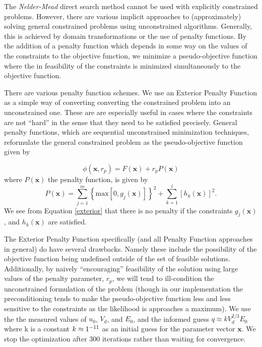 \documentclass[10pt,a4paper]{article}
\begin{document}
The \emph{Nelder-Mead} direct search method cannot be used with explicitly constrained problems. However, there are various implicit approaches to (approximately) solving general constrained problems using unconstrained algorithms. Generally, this is achieved by domain transformations or the use of penalty functions.  By the addition of a penalty function which depends in some way on the values of the constraints to the objective function, we minimize a pseudo-objective function where the in feasibility of the constraints is minimized simultaneously to the objective function. 

There are various penalty function schemes. We use an Exterior Penalty Function as a simple way of converting converting the constrained problem into an unconstrained one. These are are especially useful in cases where the constraints are not ``hard'' in the sense that they need to be satisfied precisely. General penalty functions, which are sequential unconstrained minimization techniques, reformulate the general constrained problem as the pseudo-objective function given by

\[ \phi(\mathbf{x}, r_p ) = F(\mathbf{x}) + r_p P(\mathbf{x}) \]
where $P \left( \mathbf{x} \right)$ the penalty function, is given by
\begin{equation} \label{exterior}
 P( \mathbf{x} ) = \sum_{j = 1}^m \left\lbrace \mbox{max} \left[ 0, g_j(\mathbf{x} ) \right] \right\rbrace^2 + 
\sum_{k = 1}^l \left[ h_k( \mathbf{x}) \right]^2 .
\end{equation}
We see from Equation \ref{exterior} that there is no penalty if the constraints $g_j(\mathbf{x})$, and $h_k(\mathbf{x})$ are satisfied.
 
The Exterior Penalty Function specifically (and all Penalty Function approaches in general) do have several drawbacks. Namely these include the possibility of the objective function being undefined outside of the set of feasible solutions. Additionally, by naively ``encouraging'' feasibility of the solution using large values of the penalty parameter, $r_p$, we will tend to ill-condition the unconstrained formulation of the problem (though in our implementation the preconditioning tends to make the pseudo-objective function less and less sensitive to the constraints as the likelihood is approaches a maximum). We use the the measured values of $u_0$, $V_d$, and $E_0$, and the informed guess $q \approx k V_d^{2/3} E_0$ where k is a constant $k \approx 1 \time 10^{-11}$ as an initial guess for the parameter vector $\mathbf{x}$. We stop the optimization after 300 iterations rather than waiting for convergence. 
\end{document}
